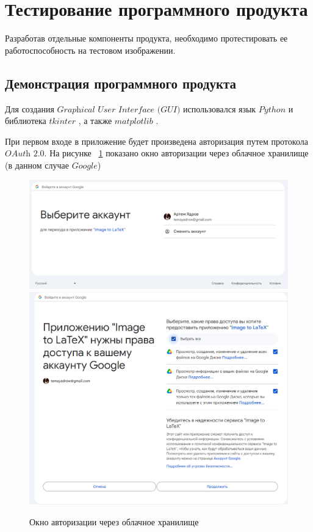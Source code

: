 \section{Тестирование программного продукта}

Разработав отдельные компоненты продукта, необходимо протестировать ее работоспособность на тестовом изображении.

\subsection{Демонстрация программного продукта}
Для создания $\textit{Graphical User Interface (GUI)}$ использовался язык $Python$ и библиотека $tkinter$ \cite{tkinter}, а также $matplotlib$ \cite{matplot}.

При первом входе в приложение будет произведена авторизация путем протокола $\textit{OAuth 2.0}$. На рисунке ~\ref{auth_window} показано окно авторизации через облачное хранилище (в данном случае $Google$)

\begin{figure}
    \includegraphics[scale=0.5]{img/app/oauth_1.png}
    \includegraphics[scale=0.3]{img/app/oauth_2.png}
    \caption{Окно авторизации через облачное хранилище}
    \label{auth_window}
\end{figure}

